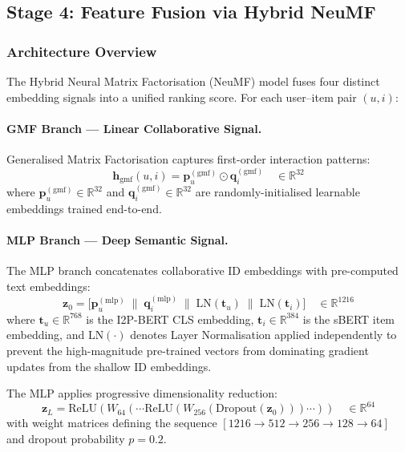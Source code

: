 \documentclass[11pt,a4paper]{article}
\begin{document}
\subsection{Stage 4: Feature Fusion via Hybrid NeuMF}

\subsubsection{Architecture Overview}
The Hybrid Neural Matrix Factorisation (NeuMF) model fuses four distinct embedding signals into a unified ranking score. For each user–item pair $(u, i)$:

\paragraph{GMF Branch — Linear Collaborative Signal.}
Generalised Matrix Factorisation captures first-order interaction patterns:
\begin{equation}
  \mathbf{h}_{\text{gmf}}(u,i) = \mathbf{p}_u^{(\text{gmf})} \odot \mathbf{q}_i^{(\text{gmf})} \quad \in \mathbb{R}^{32}
\end{equation}
where $\mathbf{p}_u^{(\text{gmf})} \in \mathbb{R}^{32}$ and $\mathbf{q}_i^{(\text{gmf})} \in \mathbb{R}^{32}$ are randomly-initialised learnable embeddings trained end-to-end.

\paragraph{MLP Branch — Deep Semantic Signal.}
The MLP branch concatenates collaborative ID embeddings with pre-computed text embeddings:
\begin{equation}
  \mathbf{z}_0 = \bigl[\mathbf{p}_u^{(\text{mlp})} \;\|\; \mathbf{q}_i^{(\text{mlp})} \;\|\; \text{LN}(\mathbf{t}_u) \;\|\; \text{LN}(\mathbf{t}_i)\bigr] \quad \in \mathbb{R}^{1216}
\end{equation}
where $\mathbf{t}_u \in \mathbb{R}^{768}$ is the I2P-BERT CLS embedding, $\mathbf{t}_i \in \mathbb{R}^{384}$ is the sBERT item embedding, and $\text{LN}(\cdot)$ denotes Layer Normalisation applied independently to prevent the high-magnitude pre-trained vectors from dominating gradient updates from the shallow ID embeddings.

The MLP applies progressive dimensionality reduction:
\begin{equation}
  \mathbf{z}_L = \text{ReLU}(W_{64}(\cdots\text{ReLU}(W_{256}(\text{Dropout}(\mathbf{z}_0)))\cdots)) \quad \in \mathbb{R}^{64}
\end{equation}
with weight matrices defining the sequence $[1216 \to 512 \to 256 \to 128 \to 64]$ and dropout probability $p=0.2$.
\end{document}
